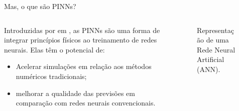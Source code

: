 \begin{frame}
  
\end{frame}

\begin{frame}{Mas, o que são PINNs?}
  \begin{columns}
    \begin{column}{0.5\textwidth}
      Introduzidas por \citeauthor{raissi_2017_I} em , as PINNs são uma forma de integrar princípios físicos ao treinamento de redes neurais. Elas têm o potencial de:
      \begin{itemize}
        \item Acelerar simulações em relação aos métodos numéricos tradicionais;
        \item melhorar a qualidade das previsões em comparação com redes neurais convencionais.
      \end{itemize}
    \end{column}
    \begin{column}{0.5\textwidth}
      \begin{figure}
        \centering
        \resizebox{\textwidth}{!}{}
        \caption{Representação de uma Rede Neural Artificial (ANN).}
      \end{figure}
    \end{column}
  \end{columns}
\end{frame}
